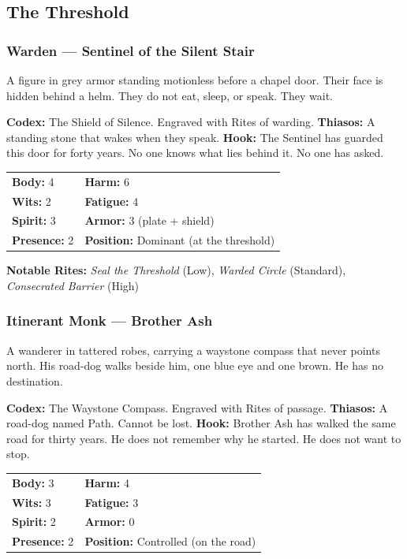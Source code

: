\subsection{The Threshold}

\subsubsection{Warden — Sentinel of the Silent Stair}

A figure in grey armor standing motionless before a chapel door. Their face is hidden behind a helm. They do not eat, sleep, or speak. They wait.

\textbf{Codex:} The Shield of Silence. Engraved with Rites of warding.
\textbf{Thiasos:} A standing stone that wakes when they speak.
\textbf{Hook:} The Sentinel has guarded this door for forty years. No one knows what lies behind it. No one has asked.

\begin{tabular}{ll}
\textbf{Body:} 4 & \textbf{Harm:} 6 \\
\textbf{Wits:} 2 & \textbf{Fatigue:} 4 \\
\textbf{Spirit:} 3 & \textbf{Armor:} 3 (plate + shield) \\
\textbf{Presence:} 2 & \textbf{Position:} Dominant (at the threshold) \\
\end{tabular}

\textbf{Notable Rites:} \textit{Seal the Threshold} (Low), \textit{Warded Circle} (Standard), \textit{Consecrated Barrier} (High)

\subsubsection{Itinerant Monk — Brother Ash}

A wanderer in tattered robes, carrying a waystone compass that never points north. His road-dog walks beside him, one blue eye and one brown. He has no destination.

\textbf{Codex:} The Waystone Compass. Engraved with Rites of passage.
\textbf{Thiasos:} A road-dog named Path. Cannot be lost.
\textbf{Hook:} Brother Ash has walked the same road for thirty years. He does not remember why he started. He does not want to stop.

\begin{tabular}{ll}
\textbf{Body:} 3 & \textbf{Harm:} 4 \\
\textbf{Wits:} 3 & \textbf{Fatigue:} 3 \\
\textbf{Spirit:} 2 & \textbf{Armor:} 0 \\
\textbf{Presence:} 2 & \textbf{Position:} Controlled (on the road) \\
\end{tabular}

